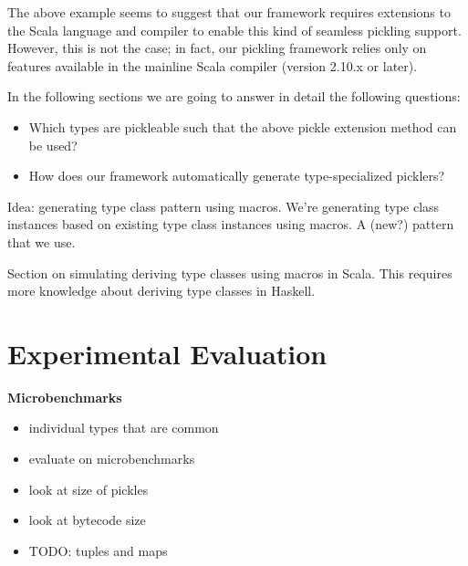 \documentclass[preprint,10pt]{sigplanconf}
\theoremstyle{definition}
\begin{document}
The above example seems to suggest that our framework requires extensions to the Scala language and compiler to enable this kind of seamless pickling support. However, this is not the case; in fact, our pickling framework relies only on features available in the mainline Scala compiler (version 2.10.x or later).

In the following sections we are going to answer in detail the following questions:

\begin{itemize}
\item Which types are pickleable such that the above pickle extension method can be used?
\item How does our framework automatically generate type-specialized picklers?
\end{itemize}

Idea: generating type class pattern using macros. We're generating type class instances based on existing type class instances using macros. A (new?) pattern that we use.

Section on simulating deriving type classes using macros in Scala. This requires more knowledge about deriving type classes in Haskell.

\section{Experimental Evaluation}

{\bf Microbenchmarks}

\begin{itemize}
\item individual types that are common
\item evaluate on microbenchmarks
\item look at size of pickles
\item look at bytecode size
\item TODO: tuples and maps
\end{itemize}
\end{document}
